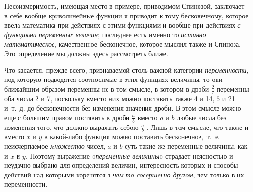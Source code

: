 {Несоизмеримость, имеющая место в примере, приводимом Спинозой, заключает в
себе вообще криволинейные функции и приводит к тому бесконечному, которое
ввела математика при действиях с этими функциями и вообще при действиях
{\em с функциями переменных величин}; последнее есть
именно то {\em истинно математическое}, качественное
бесконечное, которое мыслил также и Спиноза. Это определение мы должны
здесь рассмотреть ближе.

Что касается, прежде всего, признаваемой столь важной категории
{\em переменности}, под которую подводятся соотносимые
в этих функциях величины, то они ближайшим образом переменны не в том
смысле, в котором в дроби  $\frac 2 7$  переменны оба числа 2 и 7,
поскольку вместо них можно поставить также 4 и 14, 6 и 21 и~т.~д. до
бесконечности без изменения значения дроби. В этом смысле можно еще с
большим правом поставить в дроби  $\frac a b$  вместо
$a$ и $b$ любые числа без
изменения того, что должно выражать собою  $\frac a b$ . Лишь в том смысле,
что также и вместо $x$ и
$y$ в какой-либо функции можно поставить
бесконечное,~т.~е. неисчерпаемое {\em множество} чисел,
$a$ и $b$ суть такие же
переменные величины, как и $x$ и
$y$. Поэтому выражение
«{\em переменные величины}» страдает неясностью и
неудачно выбрано для определений величин, интересность которых и способы
действий над которыми коренятся {\em в чем-то
совершенно другом}, чем только в их переменности.

}
